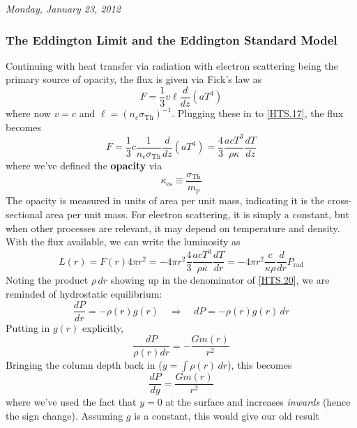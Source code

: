 \documentclass[10pt]{article}
\numberwithin{equation}{section}
\newcommand{\n}{\noindent}
\begin{document}
	\n \textit{Monday, January 23, 2012}
	\subsubsection{The Eddington Limit and the Eddington Standard Model}
	Continuing with heat transfer via radiation with electron scattering being the primary source of opacity, the flux is given via Fick's law as
	\begin{equation}
		\label{HTS.17} F=\frac{1}{3} v\ell\frac{d}{dz}(aT^4)
	\end{equation}
	where now $v=c$ and $\ell=(n_e\sigma_{\mathrm{Th}})^{-1}$. Plugging these in to \eqref{HTS.17}, the flux becomes
	\begin{equation}
		\label{HTS.18} F=\frac{1}{3}c\frac{1}{n_e\sigma_{\mathrm{Th}}}\frac{d}{dz}(aT^4)=\frac{4}{3}\frac{acT^3}{\rho\kappa}\frac{dT}{dz}
	\end{equation}
	where we've defined the \textbf{opacity} via
	\begin{equation}
		\label{HTS.19} \kappa_{\mathrm{es}}\equiv\frac{\sigma_{\mathrm{Th}}}{m_p}
	\end{equation}
	The opacity is measured in units of area per unit mass, indicating it is the cross-sectional area per unit mass. For electron scattering, it is simply a constant, but when other processes are relevant, it may depend on temperature and density. With the flux available, we can write the luminosity as
	\begin{equation}
		\label{HTS.20} L(r)=F(r)4\pi r^2=-4\pi r^2\frac{4}{3}\frac{acT^3}{\rho\kappa}\frac{dT}{dr}=-4\pi r^2\frac{c}{\kappa\rho}\frac{d}{dr}P_{\mathrm{rad}}
	\end{equation}
	Noting the product $\rho\,dr$ showing up in the denominator of \eqref{HTS.20}, we are reminded of hydrostatic equilibrium:
	\begin{equation}
		\label{HTS.21} \frac{dP}{dr}=-\rho(r)g(r)\quad \Rightarrow \quad dP=-\rho(r)g(r)\,dr
	\end{equation}
	Putting in $g(r)$ explicitly,
	\begin{equation}
		\label{HTS.22} \frac{dP}{\rho(r)dr}=-\frac{Gm(r)}{r^2}
	\end{equation}
	Bringing the column depth back in ($y=\int \rho(r)\,dr$), this becomes
	\begin{equation}
		\label{HTS.23} \frac{dP}{dy}=\frac{Gm(r)}{r^2}
	\end{equation}
	where we've used the fact that $y=0$ at the surface and increases \emph{inwards} (hence the sign change). Assuming $g$ is a constant, this would give our old result
\end{document}
